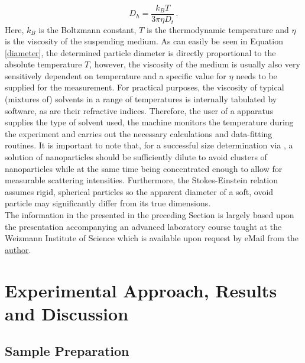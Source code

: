 \begin{equation}
\label{diameter}
	D_h = \frac{k_B T}{3\pi \eta D_t} \, .
\end{equation}
Here, $k_B$ is the Boltzmann constant, $T$ is the thermodynamic temperature and $\eta$ is the viscosity of the suspending medium. As can easily be seen in Equation \eqref{diameter}, the determined particle diameter is directly proportional to the absolute temperature $T$, however, the viscosity of the medium is usually also very sensitively dependent on temperature and a specific value for $\eta$ needs to be supplied for the measurement. For practical purposes, the viscosity of typical (mixtures of) solvents in a range of temperatures is internally tabulated by software, as are their refractive indices. Therefore, the user of a \dls{} apparatus supplies the type of solvent used, the machine monitors the temperature during the experiment and carries out the necessary calculations and data-fitting routines. It is important to note that, for a successful size determination via \dls{}, a solution of nanoparticles should be sufficiently dilute to avoid clusters of nanoparticles while at the same time being concentrated enough to allow for measurable scattering intensities. Furthermore, the Stokes-Einstein relation assumes rigid, spherical particles so the apparent diameter of a soft, ovoid particle may significantly differ from its true dimensions.\\
The information in the presented in the preceding Section is largely based upon the presentation accompanying an advanced laboratory course taught at the Weizmann Institute of Science which is available upon request by eMail from the \href{mailto:t.bretten@gmail.com}{author}.

\section{Experimental Approach, Results and Discussion}
\label{sec:expwork}
\subsection{Sample Preparation}
